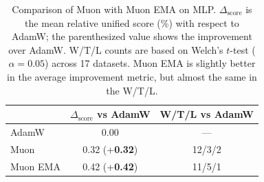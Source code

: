 \begin{table}[h]
\centering
\caption{Comparison of Muon with Muon EMA on MLP.
$\Delta_{\mathrm{score}}$ is the mean relative unified score (\%)
with respect to AdamW; the parenthesized value shows the improvement
over AdamW.  W/T/L counts are based on Welch's $t$-test ($\alpha=0.05$)
across 17 datasets. Muon EMA is slightly better in the average improvement metric, but almost the same in the W/T/L.}
\label{tab:muon-vs-muon-ema}
\small
\setlength{\tabcolsep}{5pt}
\renewcommand{\arraystretch}{1.08}
\begin{tabular}{@{}lcc@{}}
\toprule
& $\Delta_{\mathrm{score}}$ vs AdamW & W/T/L vs AdamW \\
\midrule
AdamW & 0.00 & --- \\
Muon & 0.32 {\scriptsize (\textcolor{OliveGreen}{+\textbf{0.32}})} & 12/3/2 \\
Muon EMA & 0.42 {\scriptsize (\textcolor{OliveGreen}{+\textbf{0.42}})} & 11/5/1 \\
\bottomrule
\end{tabular}
\end{table}